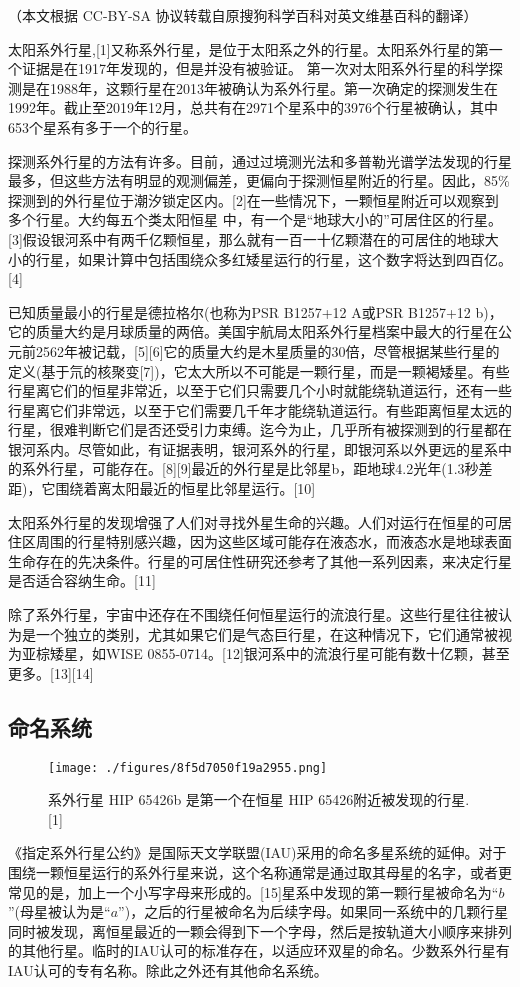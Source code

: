 
（本文根据 CC-BY-SA 协议转载自原搜狗科学百科对英文维基百科的翻译）

太阳系外行星,[1]又称系外行星，是位于太阳系之外的行星。太阳系外行星的第一个证据是在1917年发现的，但是并没有被验证。 第一次对太阳系外行星的科学探测是在1988年，这颗行星在2013年被确认为系外行星。第一次确定的探测发生在1992年。截止至2019年12月，总共有在2971个星系中的3976个行星被确认，其中653个星系有多于一个的行星。

探测系外行星的方法有许多。目前，通过过境测光法和多普勒光谱学法发现的行星最多，但这些方法有明显的观测偏差，更偏向于探测恒星附近的行星。因此，85\%探测到的外行星位于潮汐锁定区内。[2]在一些情况下，一颗恒星附近可以观察到多个行星。大约每五个类太阳恒星 中，有一个是“地球大小的”可居住区的行星。[3]假设银河系中有两千亿颗恒星，那么就有一百一十亿颗潜在的可居住的地球大小的行星，如果计算中包括围绕众多红矮星运行的行星，这个数字将达到四百亿。[4]

已知质量最小的行星是德拉格尔(也称为PSR B1257+12 A或PSR B1257+12 b)，它的质量大约是月球质量的两倍。美国宇航局太阳系外行星档案中最大的行星在公元前2562年被记载，[5][6]它的质量大约是木星质量的30倍，尽管根据某些行星的定义(基于氘的核聚变[7])，它太大所以不可能是一颗行星，而是一颗褐矮星。有些行星离它们的恒星非常近，以至于它们只需要几个小时就能绕轨道运行，还有一些行星离它们非常远，以至于它们需要几千年才能绕轨道运行。有些距离恒星太远的行星，很难判断它们是否还受引力束缚。迄今为止，几乎所有被探测到的行星都在银河系内。尽管如此，有证据表明，银河系外的行星，即银河系以外更远的星系中的系外行星，可能存在。[8][9]最近的外行星是比邻星b，距地球4.2光年(1.3秒差距)，它围绕着离太阳最近的恒星比邻星运行。[10]

太阳系外行星的发现增强了人们对寻找外星生命的兴趣。人们对运行在恒星的可居住区周围的行星特别感兴趣，因为这些区域可能存在液态水，而液态水是地球表面生命存在的先决条件。行星的可居住性研究还参考了其他一系列因素，来决定行星是否适合容纳生命。[11]

除了系外行星，宇宙中还存在不围绕任何恒星运行的流浪行星。这些行星往往被认为是一个独立的类别，尤其如果它们是气态巨行星，在这种情况下，它们通常被视为亚棕矮星，如WISE 0855-0714。[12]银河系中的流浪行星可能有数十亿颗，甚至更多。[13][14]

\subsection{ 命名系统}
\begin{figure}[ht]
\centering
\texttt{[image: ./figures/8f5d7050f19a2955.png]}
\caption{系外行星 HIP 65426b 是第一个在恒星 HIP 65426附近被发现的行星.[1]} \label{fig_TYXWXX_1}
\end{figure}
《指定系外行星公约》是国际天文学联盟(IAU)采用的命名多星系统的延伸。对于围绕一颗恒星运行的系外行星来说，这个名称通常是通过取其母星的名字，或者更常见的是，加上一个小写字母来形成的。[15]星系中发现的第一颗行星被命名为“$b$”(母星被认为是“$a$”)，之后的行星被命名为后续字母。如果同一系统中的几颗行星同时被发现，离恒星最近的一颗会得到下一个字母，然后是按轨道大小顺序来排列的其他行星。临时的IAU认可的标准存在，以适应环双星的命名。少数系外行星有IAU认可的专有名称。除此之外还有其他命名系统。

